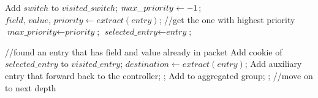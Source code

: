 \begin {tcolorbox}[blanker,float=tbp,
grow to left by=1cm, grow to right by=1cm]
\begin{algorithm}[H]
  \begin{algorithmic}[1]
      \State Add $switch$ to $visited\_switch$;
      \State $\textit max\_priority \gets -1$;  
        \State $\textit{field, value, priority} \gets extract(\textit{entry})$;
         //get the one with highest priority
          \State $\textit{max\_priority} \gets \textit{priority}$;
          \State $\textit{selected\_entry} \gets \textit{entry}$; 
        \EndIf
      \EndFor

        //found an entry that has field and value already in packet
        \State Add cookie of $selected\_entry$ to $visited\_entry$;
        \State $\textit{destination} \gets extract(\textit{entry})$;
          \State Add auxiliary entry that forward back to the controller;
          \State \Return;
        \Else
          \State Add to aggregated group;
          \State {}; //move on to next depth
        \EndIf
      \EndIf
  \end{algorithmic}
\end{algorithm}
\end{tcolorbox}

